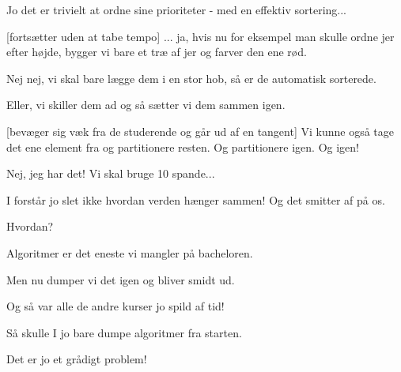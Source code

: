 \documentclass[a4paper,11pt]{article}
\begin{document}
\begin{sketch}
   Jo det er trivielt at ordne sine prioriteter - med en effektiv
  sortering...


  [fortsætter uden at tabe tempo] ... ja, hvis nu for
  eksempel man skulle ordne jer efter højde, bygger vi bare et træ af
  jer og farver den ene rød.

   Nej nej, vi skal bare lægge dem i en stor hob, så er de automatisk
  sorterede.

   Eller, vi skiller dem ad og så sætter vi dem sammen igen.

  [bevæger sig væk fra de studerende og går ud af en tangent]
  Vi kunne også tage det ene element fra og partitionere resten. Og
  partitionere igen. Og igen!

   Nej, jeg har det! Vi skal bruge 10 spande...

   I forstår jo slet ikke hvordan verden hænger sammen! Og det smitter af
  på os.

   Hvordan?

   Algoritmer er det eneste vi mangler på bacheloren.

   Men nu dumper vi det igen og bliver smidt ud.

   Og så var alle de andre kurser jo spild af tid!

   Så skulle I jo bare dumpe algoritmer fra starten.

   Det er jo et grådigt problem!

\end{sketch}
\end{document}
